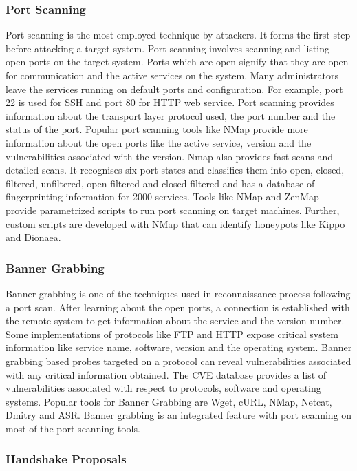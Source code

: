 \documentclass[letterpaper, 10 pt, conference]{ieeeconf}  %
\begin{document}
\subsubsection{Port Scanning}
Port scanning is the most employed technique by attackers. It forms the first step before attacking a target system. Port scanning involves scanning and listing open ports on the target system. Ports which are open signify that they are open for communication and the active services on the system. Many administrators leave the services running on default ports and configuration. For example, port 22 is used for SSH and port 80 for HTTP web service. Port scanning provides information about the transport layer protocol used, the port number and the status of the port. Popular port scanning tools like NMap\cite{NMap} provide more information about the open ports like the active service, version and the vulnerabilities associated with the version. Nmap also provides fast scans and detailed scans. It recognises six port states and classifies them into open, closed, filtered, unfiltered, open-filtered and closed-filtered and has a database of fingerprinting information for 2000 services. 
Tools like NMap and ZenMap provide parametrized scripts to run port scanning on target machines. Further, custom scripts are developed with NMap that can identify honeypots like Kippo and Dionaea.  

\subsubsection{Banner Grabbing}
Banner grabbing is one of the techniques used in reconnaissance process following a port scan. After learning about the open ports, a connection is established with the remote system to get information about the service and the version number. Some implementations of protocols like FTP and HTTP expose critical system information like service name, software, version and the operating system. Banner grabbing based probes targeted on a protocol can reveal vulnerabilities associated with any critical information obtained. The CVE database \cite{CVE} provides a list of vulnerabilities associated with respect to protocols, software and operating systems. Popular tools for Banner Grabbing are Wget, cURL, NMap, Netcat, Dmitry and ASR. Banner grabbing is an integrated feature with port scanning on most of the port scanning tools.  


\subsubsection{Handshake Proposals}
\end{document}
